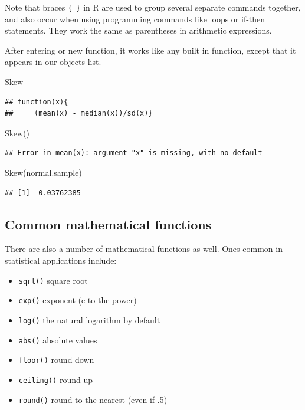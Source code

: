 \documentclass[
]{book}
\newenvironment{Shaded}{\begin{snugshade}}{\end{snugshade}}
\newcommand{\FunctionTok}[1]{\textcolor[rgb]{0.00,0.00,0.00}{#1}}
\newcommand{\NormalTok}[1]{#1}
\providecommand{\tightlist}{%
  \setlength{\itemsep}{0pt}\setlength{\parskip}{0pt}}
\begin{document}
Note that braces \texttt{\{\ \}} in R are used to group several separate commands together, and also occur when using programming commands like loops or if-then statements. They work the same as parentheses in arithmetic expressions.

After entering or new function, it works like any built in function, except that it appears in our objects list.

\begin{Shaded}
\begin{Highlighting}[]
\NormalTok{Skew}
\end{Highlighting}
\end{Shaded}

\begin{verbatim}
## function(x){
##     (mean(x) - median(x))/sd(x)}
\end{verbatim}

\begin{Shaded}
\begin{Highlighting}[]
\FunctionTok{Skew}\NormalTok{()}
\end{Highlighting}
\end{Shaded}

\begin{verbatim}
## Error in mean(x): argument "x" is missing, with no default
\end{verbatim}

\begin{Shaded}
\begin{Highlighting}[]
\FunctionTok{Skew}\NormalTok{(normal.sample)}
\end{Highlighting}
\end{Shaded}

\begin{verbatim}
## [1] -0.03762385
\end{verbatim}

\hypertarget{common-mathematical-functions}{%
\subsection*{Common mathematical functions}\label{common-mathematical-functions}}

There are also a number of mathematical functions as well. Ones common in statistical applications include:

\begin{itemize}
\tightlist
\item
  \texttt{sqrt()} square root
\item
  \texttt{exp()} exponent (e to the power)
\item
  \texttt{log()} the natural logarithm by default
\item
  \texttt{abs()} absolute values
\item
  \texttt{floor()} round down
\item
  \texttt{ceiling()} round up
\item
  \texttt{round()} round to the nearest (even if .5)
\end{itemize}
\end{document}
